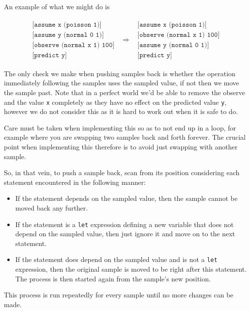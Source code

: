 \documentclass[a4paper]{article}
\newcommand{\optimization}[2]{
	\[
		\begin{array}{rcl}
			#1 & \Rightarrow & #2
		\end{array}
	\]
}
\begin{document}
An example of what we might do is
\optimization{
	\begin{array}{l}
		\texttt{[assume x (poisson 1)]} \\
		\texttt{[assume y (normal 0 1)]} \\
		\texttt{[observe (normal x 1) 100]} \\
		\texttt{[predict y]}
	\end{array}
}{
	\begin{array}{l}
		\texttt{[assume x (poisson 1)]} \\
		\texttt{[observe (normal x 1) 100]} \\
		\texttt{[assume y (normal 0 1)]} \\
		\texttt{[predict y]}
	\end{array}
}
The only check we make when pushing samples back is whether the operation immediately following the samples uses the sampled value, if not then we move the sample past. Note that in a perfect world we'd be able to remove the observe and the value \texttt{x} completely as they have no effect on the predicted value \texttt{y}, however we do not consider this as it is hard to work out when it is safe to do.

Care must be taken when implementing this so as to not end up in a loop, for example where you are swapping two samples back and forth forever. The crucial point when implementing this therefore is to avoid just swapping with another sample.

So, in that vein, to push a sample back, scan from its position considering each statement encountered in the following manner:
\begin{itemize}
\item
	If the statement depends on the sampled value, then the sample cannot be moved back any further.

\item
	If the statement is a \texttt{let} expression defining a new variable that does not depend on the sampled value, then just ignore it and move on to the next statement.

\item
	If the statement does depend on the sampled value and is not a \texttt{let} expression, then the original sample is moved to be right after this statement. The process is then started again from the sample's new position.

\end{itemize}
This process is run repeatedly for every sample until no more changes can be made.
\end{document}
